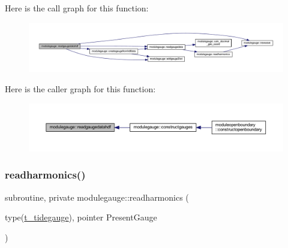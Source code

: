 Here is the call graph for this function\+:\nopagebreak
\begin{figure}[H]
\begin{center}
\leavevmode
\includegraphics[width=350pt]{namespacemodulegauge_a26f00d7d5cd5edd1ce28da62855cb19f_cgraph}
\end{center}
\end{figure}
Here is the caller graph for this function\+:\nopagebreak
\begin{figure}[H]
\begin{center}
\leavevmode
\includegraphics[width=350pt]{namespacemodulegauge_a26f00d7d5cd5edd1ce28da62855cb19f_icgraph}
\end{center}
\end{figure}
\mbox{\label{namespacemodulegauge_a9095cfa51e7b4150e1d3889efe30b265}} 
\subsubsection{\texorpdfstring{readharmonics()}{readharmonics()}}
{\footnotesize\ttfamily subroutine, private modulegauge\+::readharmonics (\begin{DoxyParamCaption}\item[{type(\mbox{\hyperlink{structmodulegauge_1_1t__tidegauge}{t\+\_\+tidegauge}}), pointer}]{Present\+Gauge }\end{DoxyParamCaption})\hspace{0.3cm}{\ttfamily [private]}}

